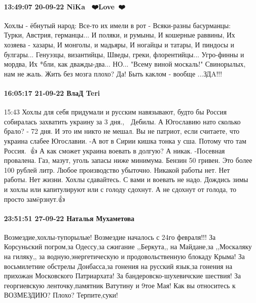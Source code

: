 \paragraph{13:49:07 20-09-22 NiKa 🤍💙❤️Love🤍💙❤️}

Хохлы - ёбнутый народ:
Все-то их имели в рот -
Всяки-разны басурманцы:
Турки, Австрия, германцы...
И поляки, и румыны,
И кошерные раввины,
Их хозяева - хазары,
И монголы, и мадьяры,
И ногайцы и татары,
И пиндосы и булгары...
Генуэзцы, византийцы,
Шведы, греки, флорентийцы...
Угро-финны и мордва,
Их *бли, как дважды-два...
НО...
"Всему виной москаль!"
Свинорылых, нам не жаль.
Жить без мозга плохо? Да!
Быть каклом - вообще ...ЗДA!!!

\paragraph{16:05:17 21-09-22 ВлаД Teri}
15:43
Хохлы для себя придумали и русским навязывают, будто бы Россия собиралась захватить украину за 3 дня., 🙂
Дебилы. А Югославию нато сколько брало?
- 72 дня. И это им никто не мешал.
Вы не патриот, если считаете, что украина слабее Югославии.
-А вот в Сирии кишка тонка у сша. Потому что там Россия. 🙂👍
А как сможет украина воевать в долгую?
А никак.
-Посевная провалена. Газ, мазут, уголь запасы ниже минимума.
Бензин 50 гривен.
Это более 100 рублей литр.
Любое производство убыточно.
Никакой работы нет.
Нет работы. Нет жизни.
Хохлы сдавайтесь.
С вами и воевать не надо. Дождись зимы и хохлы или капитулируют или с голоду сдохнут.
А не сдохнут от голода, то просто замëрзнут.👍

\paragraph{23:51:51 27-09-22 Наталья Мухаметова}

Возмездие,хохлы-тупорылые! Возмездие началось с 24го февраля!!! За Корсуньский
погром,за Одессу,за сжигание ,,Беркута,, на Майдане,за ,,Москаляку на гиляку,,
за водную,энергетическую и продовольственную блокаду Крыма! За восьмилетние
обстрелы Донбасса,за гонения на русский язык,за гонения на прихожан Московского
Патриархата! За бандеровско-шухевичские шествия! За георгиевскую
ленточку,памятник Ватутину и 9тое Мая! Как вы относитесь к ВОЗМЕЗДИЮ? Плохо?
Терпите,суки!
